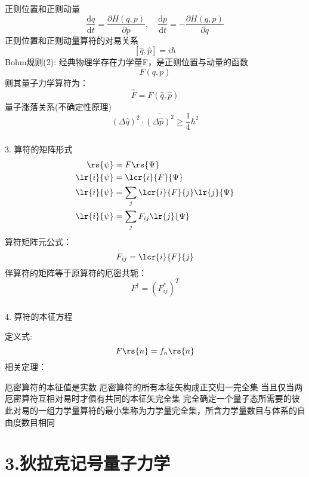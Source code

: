 \begin{frame}
    \frametitle{}     
{\Bullet}正则位置和正则动量
  \[ \frac{\mathrm{d }q}{\mathrm{d }t} = \frac{\partial H(q,p) }{\partial p}, \quad \frac{\mathrm{d }p}{\mathrm{d }t} = -\frac{ \partial H(q,p) }{\partial q} \]
  正则位置和正则动量算符的对易关系
  \[ [\hat{q},\hat{p}]=i\hbar\]
  \alert{Bohm规则(2):} 经典物理学存在力学量F，是正则位置与动量的函数
  \[F(q,p)\]
  则其量子力学算符为：
  \[\hat{F}=F(\hat{q},\hat{p})\]
  量子涨落关系(不确定性原理) \[\overline{(\Delta \hat{q})^2} \cdot \overline{(\Delta \hat{p})^2} \geq  \frac{1}{4} \hbar ^2 \]
\end{frame} 

\begin{frame}
    \frametitle{}
    3. 算符的矩阵形式
    \[\begin{aligned}
        \rs{\psi}&=F \rs{\Psi} \\
        \lr{i}{\psi}&= \lcr{i}{F}{\Psi} \\
        \lr{i}{\psi}&= \sum_j\lcr{i}{F}{j}\lr{j}{\Psi} \\
        \lr{i}{\psi}&= \sum_j F_{ij}\lr{j}{\Psi}
    \end{aligned}\]  
    算符矩阵元公式：\[ F_{ij}=\lcr{i}{F}{j}\]
    伴算符的矩阵等于原算符的厄密共轭：\[ F^{\dagger}=(F_{ij} ^*)^T\]
\end{frame}

\begin{frame}
    \frametitle{}
    4. 算符的本征方程
    \begin{itemize}
        \Item 定义式: \[F \rs{n}=f_n\rs{n}\]
        \Item 相关定理：
        \begin{itemize}
            \IItem 厄密算符的本征值是实数
            \IItem 厄密算符的所有本征矢构成正交归一完全集
            \IItem 当且仅当两厄密算符互相对易时才俱有共同的本征矢完全集
            \IItem 完全确定一个量子态所需要的彼此对易的一组力学量算符的最小集称为力学量完全集，所含力学量数目与体系的自由度数目相同
            \end{itemize}
    \end{itemize}
\end{frame}

\section{3.狄拉克记号量子力学}

